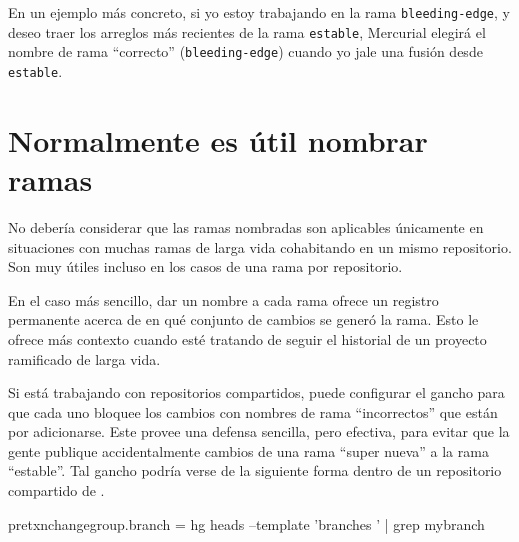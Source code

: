 En un ejemplo más concreto, si yo estoy trabajando en la rama
\texttt{bleeding-edge}, y deseo traer los arreglos más recientes de la
rama \texttt{estable}, Mercurial elegirá el nombre de rama ``correcto''
(\texttt{bleeding-edge}) cuando yo jale una fusión desde \texttt{estable}.

\section{Normalmente es útil nombrar ramas}

No debería considerar que las ramas nombradas son aplicables
únicamente en situaciones con muchas ramas de larga vida cohabitando
en un mismo repositorio.  Son muy útiles incluso en los casos de
una rama por repositorio.

En el caso más sencillo, dar un nombre a cada rama ofrece un registro
permanente acerca de en qué conjunto de cambios se generó la rama.
Esto le ofrece más contexto cuando esté tratando de seguir el
historial de un proyecto ramificado de larga vida.

Si está trabajando con repositorios compartidos, puede configurar el gancho
 para que cada uno bloquee los cambios con
nombres de rama ``incorrectos'' que están por adicionarse.  Este
provee una defensa sencilla, pero efectiva, para evitar que la gente
publique accidentalmente cambios de una rama ``super nueva'' a la rama
``estable''.  Tal gancho podría verse de la siguiente forma dentro de
un repositorio compartido de \hgrc.
\begin{codesample2}
  [hooks]
  pretxnchangegroup.branch = hg heads --template '{branches} ' | grep mybranch
\end{codesample2}

